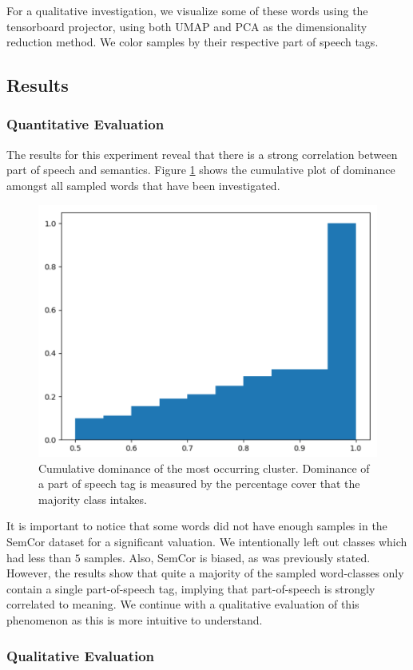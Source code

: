 \documentclass[a4paper,12pt,oneside,openright]{report}
\begin{document}
For a qualitative investigation, we visualize some of these words using the tensorboard projector, using both UMAP and PCA as the dimensionality reduction method.
We color samples by their respective part of speech tags.

\subsection{Results}

\subsubsection{Quantitative Evaluation}

The results for this experiment reveal that there is a strong correlation between part of speech and semantics.
Figure \ref{fig:POS_dominance} shows the cumulative plot of dominance amongst all sampled words that have been investigated.

\begin{figure}[H]
	\center
  \includegraphics[width=0.5\linewidth]{./assets/experiments/pos_dominance_calculation.png}
  \caption{Cumulative dominance of the most occurring cluster. Dominance of a part of speech tag is measured by the percentage cover that the majority class intakes.}
  \label{fig:POS_dominance}
\end{figure}

It is important to notice that some words did not have enough samples in the SemCor dataset for a significant valuation. 
We intentionally left out classes which had less than $5$ samples.
Also, SemCor is biased, as was previously stated.
However, the results show that quite a majority of the sampled word-classes only contain a single part-of-speech tag, implying that part-of-speech is strongly correlated to meaning.
We continue with a qualitative evaluation of this phenomenon as this is more intuitive to understand.

\subsubsection{Qualitative Evaluation}
\end{document}
